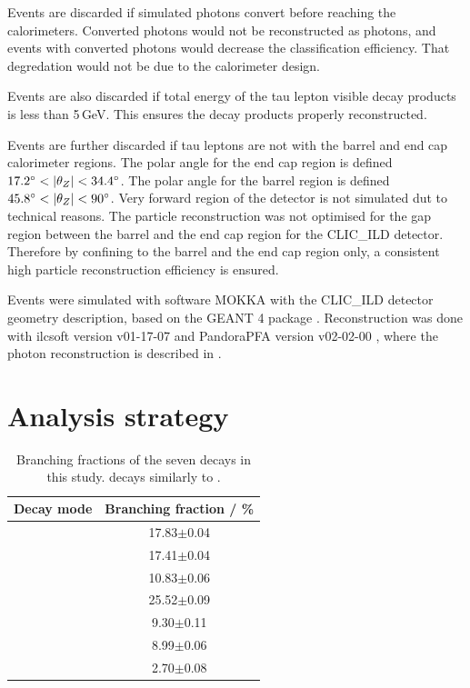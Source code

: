 \documentclass[a4paper,11pt]{article}
\newcommand{\decayElectron}{\Pem\PAGne\PGnGt}
\newcommand{\decayMuon}{\PGmm\PAGnGm\PGnGt}
\newcommand{\decayPion}{\PGpm\PGnGt}
\newcommand{\decayRho}{\PGrP{\PGpm\PGpz}\PGnGt}
\newcommand{\decayAiPhoton}{\PaDoP{\PGpm\PGpz\PGpz}\PGnGt}
\newcommand{\decayAiPion}{\PaDoP{\PGpm\PGpm\PGpp}\PGnGt}
\newcommand{\decayThreePionPhoton}{\PGpm\PGpm\PGpp\PGpz\PGnGt}
\begin{document}
Events are discarded if simulated photons convert before reaching the calorimeters. Converted photons would not be reconstructed as photons, and events with converted photons would decrease the classification efficiency. That degredation would not be due to the calorimeter design.

Events are also discarded if total energy of the tau lepton visible decay products is less than 5\,GeV. This ensures the decay products properly reconstructed.

Events are further discarded if tau leptons are not with the barrel and end cap calorimeter regions. The polar angle for the end cap region is defined $ 17.2\degree < |\theta_{Z}| < 34.4\degree$. The polar angle for the barrel region is defined $ 45.8\degree < |\theta_{Z}| < 90\degree$. Very forward region of the detector is not simulated dut to technical reasons. The particle reconstruction was not optimised for the gap region between the barrel and the end cap region for the CLIC\_ILD detector. Therefore by confining to the barrel and the end cap region only, a consistent high particle reconstruction efficiency is ensured.


Events were simulated with software MOKKA \cite{MoradeFreitas:2002kj} with the CLIC\_ILD detector geometry description, based on the GEANT 4 package  \cite{Agostinelli:2002hh}. Reconstruction was done with ilcsoft version v01-17-07 \cite{Gaede:82475} and PandoraPFA version v02-02-00 \cite{Marshall:2015rfa}, where the photon reconstruction is described in \cite{Xu:2016rcz}.


\section{Analysis strategy}

\begin{table}[htbp]
\centering
\caption{\label{tab:decay_mode} Branching fractions of the seven \PGtm decays in this study\cite{Agashe:2014kda}. \PGtp decays similarly to \PGtm.}
\smallskip
\begin{tabular}{|l |c|}
\hline
  \textbf{Decay mode} & \textbf{Branching fraction / \%} \\
\hline
  \decayElectron        & 17.83$\pm$0.04   \\
  \decayMuon  	& 17.41$\pm$0.04  \\
  \decayPion     	& 10.83$\pm$0.06   \\
  \decayRho	& 25.52$\pm$0.09 \\
  \decayAiPhoton	& 9.30$\pm$0.11    \\
  \decayAiPion  	    & 8.99$\pm$0.06  \\
  \decayThreePionPhoton  	    & 2.70$\pm$0.08  \\

\hline
\end{tabular}
\end{table}
\end{document}
